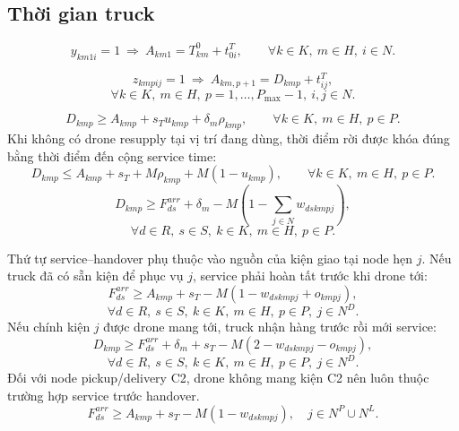 \documentclass[12pt,a4paper]{article}
\begin{document}
\subsection{Thời gian truck}

\begin{equation}
  y_{km1i}=1\ \Longrightarrow\
  A_{km1}=T^0_{km}+t^T_{0i},
  \qquad \forall k\in K,\ m\in H,\ i\in N.
\end{equation}

\begin{equation}
  z_{kmpij}=1\ \Longrightarrow\
  A_{km,p+1}=D_{kmp}+t^T_{ij},
\end{equation}
\[
  \forall k\in K,\ m\in H,\ p=1,\ldots,P_{\max}-1,\ i,j\in N.
\]

\begin{equation}
  D_{kmp}\ge A_{kmp}+s_Tu_{kmp}+\delta_m\rho_{kmp},
  \qquad \forall k\in K,\ m\in H,\ p\in P.
\end{equation}
Khi không có drone resupply tại vị trí đang dùng, thời điểm rời được khóa đúng bằng
thời điểm đến cộng service time:
\begin{equation}
  D_{kmp}\le A_{kmp}+s_T+M\rho_{kmp}+M(1-u_{kmp}),
  \qquad \forall k\in K,\ m\in H,\ p\in P.
\end{equation}
\begin{equation}
  D_{kmp}\ge F^{arr}_{ds}+\delta_m
  -M\left(1-\sum_{j\in N}w_{dskmpj}\right),
\end{equation}
\[
  \forall d\in R,\ s\in S,\ k\in K,\ m\in H,\ p\in P.
\]

Thứ tự service--handover phụ thuộc vào nguồn của kiện giao tại node hẹn $j$.
Nếu truck đã có sẵn kiện để phục vụ $j$, service phải hoàn tất trước khi drone tới:
\begin{equation}
 F^{arr}_{ds}\ge A_{kmp}+s_T
 -M\left(1-w_{dskmpj}+o_{kmpj}\right),
\end{equation}
\[
 \forall d\in R,\ s\in S,\ k\in K,\ m\in H,\ p\in P,\ j\in N^D.
\]
Nếu chính kiện $j$ được drone mang tới, truck nhận hàng trước rồi mới service:
\begin{equation}
 D_{kmp}\ge F^{arr}_{ds}+\delta_m+s_T
 -M\left(2-w_{dskmpj}-o_{kmpj}\right),
\end{equation}
\[
 \forall d\in R,\ s\in S,\ k\in K,\ m\in H,\ p\in P,\ j\in N^D.
\]
Đối với node pickup/delivery C2, drone không mang kiện C2 nên luôn thuộc trường hợp
service trước handover.
\begin{equation}
 F^{arr}_{ds}\ge A_{kmp}+s_T-M(1-w_{dskmpj}),
 \quad j\in N^P\cup N^L.
\end{equation}
\end{document}
